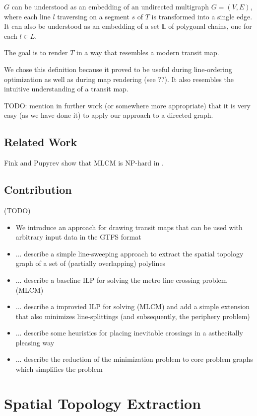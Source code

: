 \documentclass{llncs}
\begin{document}
$G$ can be understood as an embedding of an undirected multigraph $G = (V, E)$, where each line $l$ traversing on a segment $s$ of $T$ is transformed into a single edge. It can also be understood as an embedding of a set $\mathbb{L}$ of polygonal chains, one for each $l \in L$.

The goal is to render $T$ in a way that resembles a modern transit map.

We chose this definition because it proved to be useful during line-ordering optimization as well as during map rendering (see ??). It also resembles the intuitive understanding of a transit map.


TODO: mention in further work (or somewhere more appropriate) that it is very easy (as we have done it) to apply our approach to a directed graph.

%
\subsection{Related Work}
%
Fink and Pupyrev show that MLCM is NP-hard in \cite{fink:pupyrev}.
%
\subsection{Contribution}
%
(TODO)
\begin{itemize}
\item We introduce an approach for drawing transit maps that can be used with arbitrary input data in the GTFS format
\item ... describe a simple line-sweeping approach to extract the spatial topology graph of a set of (partially overlapping) polylines
\item ... describe a baseline ILP for solving the metro line crossing problem (MLCM)
\item ... describe a improvied ILP for solving (MLCM) and add a simple extension that also minimizes line-splittings (and subsequently, the periphery problem)
\item ... describe some heuristics for placing inevitable crossings in a asthecitally pleasing way
\item ... describe the reduction of the minimization problem to core problem graphs which simplifies the problem
\end{itemize}

%
\section{Spatial Topology Extraction}
%
\end{document}
